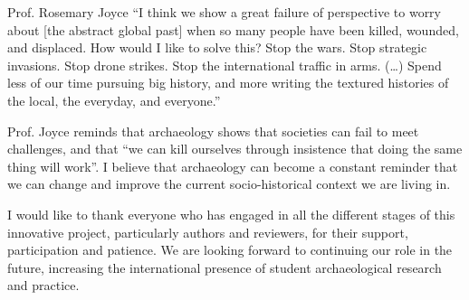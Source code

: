 \begin{aquote}{Prof. Rosemary Joyce}
“I think we show a great failure of perspective to worry about [the abstract global past] when so many people have been killed, wounded, and displaced. How would I like to solve this? Stop the wars. Stop strategic invasions. Stop drone strikes. Stop the international traffic in arms. (\ldots) Spend less of our time pursuing big history, and more writing the textured histories of the local, the everyday, and everyone.”
\end{aquote}
Prof. Joyce reminds that archaeology shows that societies can fail to meet challenges, and that “we can kill ourselves through insistence that doing the same thing will work”. I believe that archaeology can become a constant reminder that we can change and improve the current socio-historical context we are living in.

		I would like to thank everyone who has engaged in all the different stages of this innovative project, particularly authors and reviewers, for their support, participation and patience. We are looking forward to continuing our role in the future, increasing the international presence of student archaeological research and practice. 

		

	\label{presentation:lastpage}
\closingarticle
